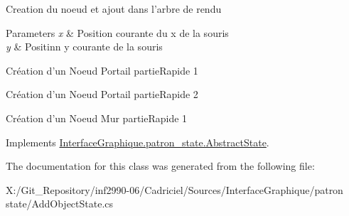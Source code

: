 Creation du noeud et ajout dans l'arbre de rendu 


\begin{DoxyParams}{Parameters}
{\em x} & Position courante du x de la souris\\
\hline
{\em y} & Positinn y courante de la souris\\
\hline
\end{DoxyParams}
Création d'un Noeud Portail partie\-Rapide 1

Création d'un Noeud Portail partie\-Rapide 2

Création d'un Noeud Mur partie\-Rapide 1 

Implements \hyperlink{class_interface_graphique_1_1patron__state_1_1_abstract_state_a8df97c5a2784f9757608d669fbb1c6b5}{Interface\-Graphique.\-patron\-\_\-state.\-Abstract\-State}.



The documentation for this class was generated from the following file\-:\begin{DoxyCompactItemize}
\item 
X\-:/\-Git\-\_\-\-Repository/inf2990-\/06/\-Cadriciel/\-Sources/\-Interface\-Graphique/patron state/Add\-Object\-State.\-cs\end{DoxyCompactItemize}
